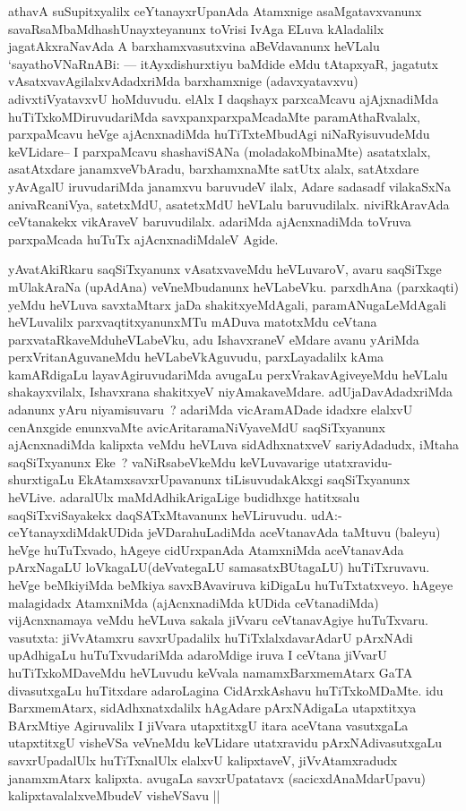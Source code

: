 \begin{artha}
athavA suSupitxyalilx ceYtanayxrUpanAda Atamxnige asaMgatavxvanunx
savaRsaMbaMdhashUnayxteyanunx toVrisi IvAga ELuva kAladalilx
jagatAkxraNavAda A barxhamxvasutxvina aBeVdavanunx heVLalu
`sayathoVNaRnABi: {\rm ---} itAyxdishurxtiyu baMdide eMdu tAtapxyaR,
jagatutx vAsatxvavAgilalxvAdadxriMda barxhamxnige (adavxyatavxvu)
adivxtiVyatavxvU hoMduvudu. elAlx I daqshayx parxcaMcavu ajAjxnadiMda
huTiTxkoMDiruvudariMda savxpanxparxpaMcadaMte paramAthaRvalalx,
parxpaMcavu heVge ajAcnxnadiMda huTiTxteMbudAgi niNaRyisuvudeMdu
keVLidare-- I parxpaMcavu shashaviSANa (moladakoMbinaMte) asatatxlalx,
asatAtxdare janamxveVbAradu, barxhamxnaMte satUtx alalx, satAtxdare
yAvAgalU iruvudariMda janamxvu baruvudeV ilalx, Adare sadasadf
vilakaSxNa anivaRcaniVya, satetxMdU, asatetxMdU heVLalu
baruvudilalx. niviRkAravAda ceVtanakekx vikAraveV
baruvudilalx. adariMda ajAcnxnadiMda toVruva parxpaMcada huTuTx
ajAcnxnadiMdaleV Agide.
\end{artha}

\begin{artha}
yAvatAkiRkaru saqSiTxyanunx vAsatxvaveMdu heVLuvaroV, avaru saqSiTxge
 mUlakAraNa (upAdAna) veVneMbudanunx heVLabeVku. parxdhAna
(parxkaqti) yeMdu heVLuva savxtaMtarx jaDa shakitxyeMdAgali,
paramANugaLeMdAgali heVLuvalilx parxvaqtitxyanunxMTu mADuva matotxMdu
ceVtana parxvataRkaveMduheVLabeVku, adu 	 IshavxraneV eMdare avanu
yAriMda perxVritanAguvaneMdu heVLabeVkAguvudu,  parxLayadalilx kAma
kamARdigaLu layavAgiruvudariMda avugaLu perxVrakavAgiveyeMdu heVLalu
shakayxvilalx, Ishavxrana shakitxyeV
niyAmakaveMdare. adUjaDavAdadxriMda adanunx yAru niyamisuvaru~?
adariMda vicAramADade idadxre elalxvU cenAnxgide enunxvaMte
avicAritaramaNiVyaveMdU saqSiTxyanunx ajAcnxnadiMda kalipxta veMdu
heVLuva sidAdhxnatxveV sariyAdadudx, iMtaha saqSiTxyanunx Eke~?
vaNiRsabeVkeMdu keVLuvavarige utatxravidu- shurxtigaLu
EkAtamxsavxrUpavanunx tiLisuvudakAkxgi saqSiTxyanunx
heVLive. adaralUlx maMdAdhikArigaLige budidhxge hatitxsalu
saqSiTxviSayakekx daqSATxMtavanunx heVLiruvudu. udA:-
ceYtanayxdiMdakUDida jeVDarahuLadiMda aceVtanavAda taMtuvu (baleyu) heVge
huTuTxvado, hAgeye cidUrxpanAda AtamxniMda aceVtanavAda pArxNagaLU
loVkagaLU(deVvategaLU samasatxBUtagaLU) huTiTxruvavu. heVge beMkiyiMda
beMkiya savxBAvaviruva kiDigaLu huTuTxtatxveyo. hAgeye malagidadx
AtamxniMda (ajAcnxnadiMda kUDida ceVtanadiMda) vijAcnxnamaya veMdu
heVLuva sakala jiVvaru ceVtanavAgiye huTuTxvaru. vasutxta: jiVvAtamxru
savxrUpadalilx huTiTxlalxdavarAdarU pArxNAdi upAdhigaLu
huTuTxvudariMda adaroMdige iruva I ceVtana jiVvarU huTiTxkoMDaveMdu
heVLuvudu keVvala namamxBarxmemAtarx GaTA divasutxgaLu huTitxdare
adaroLagina CidArxkAshavu huTiTxkoMDaMte. idu BarxmemAtarx,
sidAdhxnatxdalilx hAgAdare pArxNAdigaLa utapxtitxya BArxMtiye
Agiruvalilx I jiVvara utapxtitxgU itara aceVtana vasutxgaLa
utapxtitxgU visheVSa veVneMdu keVLidare utatxravidu pArxNAdivasutxgaLu
savxrUpadalUlx huTiTxnalUlx elalxvU kalipxtaveV, jiVvAtamxradudx
janamxmAtarx kalipxta. avugaLa savxrUpatatavx (sacicxdAnaMdarUpavu)
kalipxtavalalxveMbudeV visheVSavu ||
\end{artha}


